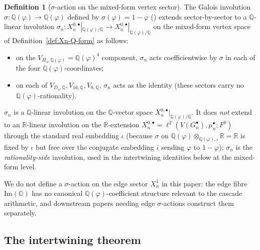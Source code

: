 \documentclass[11pt, a4paper]{amsart}
\theoremstyle{definition}
\newtheorem{definition}[theorem]{Definition}
\newcommand{\R}{\mathbb{R}}
\newcommand{\Q}{\mathbb{Q}}
\newcommand{\OO}{\mathbb{O}}
\renewcommand{\Im}{\mathrm{Im}}
\begin{document}
\begin{definition}[$\sigma$-action on the mixed-form vertex sector]
\label{def:sigma}
The Galois involution $\sigma \colon \Q(\varphi) \to \Q(\varphi)$
defined by $\sigma(\varphi) = 1 - \varphi$
(\cite[Def.~\texttt{def:sigma}]{SigmaRationality}) extends
sector-by-sector to a $\Q$-linear involution
$\sigma_n \colon X_n^{0, \bullet}|_{\Q(\varphi)/\Q}
\to X_n^{0, \bullet}|_{\Q(\varphi)/\Q}$
on the mixed-form vertex space of
Definition~\ref{def:Xn-Q-form} as follows:
\begin{itemize}[topsep=2pt]
\item on the $V_{H_4, \Q(\varphi)} = \Q(\varphi)^4$ component,
  $\sigma_n$ acts coefficientwise by $\sigma$ in each of the four
  $\Q(\varphi)$-coordinates;
\item on each of $V_{D_4, \Q}, V_{16, \Q}, V_{8, \Q}$, $\sigma_n$
  acts as the identity (these sectors carry no
  $\Q(\varphi)$-rationality).
\end{itemize}
$\sigma_n$ is a $\Q$-linear involution on the $\Q$-vector space
$X_n^{0, \bullet}|_{\Q(\varphi)/\Q}$. It does \emph{not} extend to
an $\R$-linear involution on the $\R$-extension
$X_n^{0, \bullet} = \ell^2(V(G_n^\bullet), \mu_n^\bullet; F^0)$
through the standard real embedding $\iota$ (because $\sigma$ on
$\Q(\varphi) \otimes_{\Q(\varphi), \iota} \R = \R$ is fixed by
$\iota$ but free over the conjugate embedding $\bar\iota$ sending
$\varphi$ to $1 - \varphi$); $\sigma_n$ is the \emph{rationality-side}
involution, used in the intertwining identities below at the
mixed-form level.

We do not define a $\sigma$-action on the edge sector $X_n^1$ in
this paper: the edge fibre $\Im(\OO)$ has no canonical
$\Q(\varphi)$-coefficient structure relevant to the cascade
arithmetic, and downstream papers needing edge $\sigma$-actions
construct them separately.
\end{definition}

\subsection{The intertwining theorem}
\end{document}
